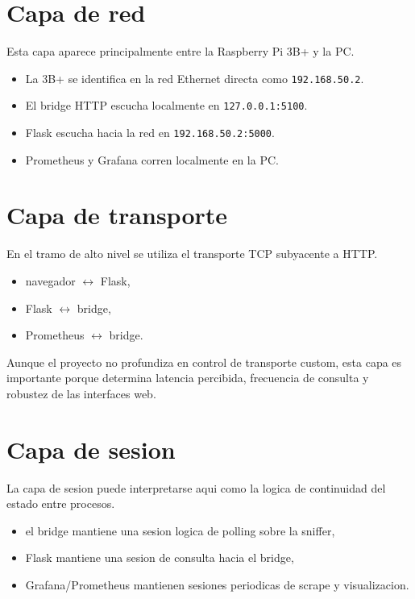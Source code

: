 \documentclass[12pt,a4paper]{report}
\begin{document}
\section{Capa de red}

Esta capa aparece principalmente entre la Raspberry Pi 3B+ y la PC.

\begin{itemize}
    \item La 3B+ se identifica en la red Ethernet directa como \texttt{192.168.50.2}.
    \item El bridge HTTP escucha localmente en \texttt{127.0.0.1:5100}.
    \item Flask escucha hacia la red en \texttt{192.168.50.2:5000}.
    \item Prometheus y Grafana corren localmente en la PC.
\end{itemize}

\section{Capa de transporte}

En el tramo de alto nivel se utiliza el transporte TCP subyacente a HTTP.

\begin{itemize}
    \item navegador $\leftrightarrow$ Flask,
    \item Flask $\leftrightarrow$ bridge,
    \item Prometheus $\leftrightarrow$ bridge.
\end{itemize}

Aunque el proyecto no profundiza en control de transporte custom, esta capa es importante porque determina latencia percibida, frecuencia de consulta y robustez de las interfaces web.

\section{Capa de sesion}

La capa de sesion puede interpretarse aqui como la logica de continuidad del estado entre procesos.

\begin{itemize}
    \item el bridge mantiene una sesion logica de polling sobre la sniffer,
    \item Flask mantiene una sesion de consulta hacia el bridge,
    \item Grafana/Prometheus mantienen sesiones periodicas de scrape y visualizacion.
\end{itemize}
\end{document}
